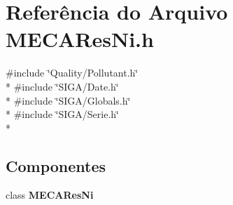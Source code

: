 \section{Referência do Arquivo M\+E\+C\+A\+Res\+Ni.\+h}
\label{_m_e_c_a_res_ni_8h}
{\ttfamily \#include \char`\"{}Quality/\+Pollutant.\+h\char`\"{}}\\*
{\ttfamily \#include \char`\"{}S\+I\+G\+A/\+Date.\+h\char`\"{}}\\*
{\ttfamily \#include \char`\"{}S\+I\+G\+A/\+Globals.\+h\char`\"{}}\\*
{\ttfamily \#include \char`\"{}S\+I\+G\+A/\+Serie.\+h\char`\"{}}\\*
\subsection*{Componentes}
\begin{DoxyCompactItemize}
\item 
class {\bf M\+E\+C\+A\+Res\+Ni}
\end{DoxyCompactItemize}
